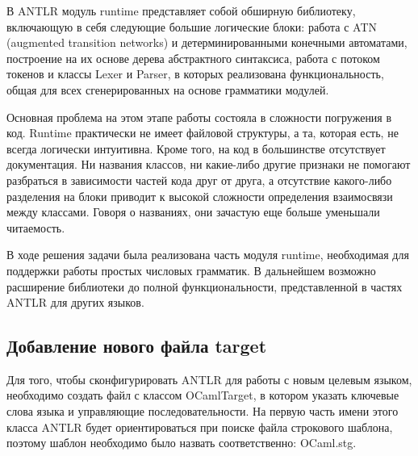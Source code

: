 В ANTLR модуль runtime представляет собой обширную библиотеку, включающую в себя следующие большие логические блоки: работа с ATN (augmented transition networks) и детерминированными конечными автоматами, построение на их основе дерева абстрактного синтаксиса, работа с потоком токенов и классы Lexer и Parser, в которых реализована функциональность, общая для всех сгенерированных на основе грамматики модулей. 

Основная проблема на этом этапе работы состояла в сложности погружения в код. 
Runtime практически не имеет файловой структуры, а та, которая есть, не всегда логически интуитивна. 
Кроме того, на код в большинстве отсутствует документация. 
Ни названия классов, ни какие-либо другие признаки не помогают разбраться в зависимости частей кода друг от друга, а отсутствие какого-либо разделения на блоки приводит к высокой сложности определения взаимосвязи между классами. 
Говоря о названиях, они зачастую еще больше уменьшали читаемость. 

В ходе решения задачи была реализована часть модуля runtime, необходимая для поддержки работы простых числовых грамматик. 
В дальнейшем возможно расширение библиотеки до полной функциональности, представленной в частях ANTLR для других языков.

\subsection{Добавление нового файла target}
\label{subsec:misc}

Для того, чтобы сконфигурировать ANTLR для работы с новым целевым языком, необходимо создать файл с классом OCamlTarget, в котором указать ключевые слова языка и управляющие последовательности. 
На первую часть имени этого класса ANTLR будет ориентироваться при поиске файла строкового шаблона, поэтому шаблон необходимо было назвать соответственно: OCaml.stg.

